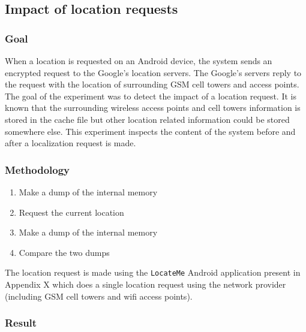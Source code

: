 \subsection{Impact of location requests}

\subsubsection{Goal}

When a location is requested on an Android device, the system sends an encrypted request to the Google's location servers.
The Google's servers reply to the request with the location of surrounding GSM cell towers and access points.\\

The goal of the experiment was to detect the impact of a location request.
It is known that the surrounding wireless access points and cell towers information is stored in the cache file but other location related information could be stored somewhere else.
This experiment inspects the content of the system before and after a localization request is made.


\subsubsection{Methodology}

\begin{enumerate}
\item Make a dump of the internal memory
\item Request the current location
\item Make a dump of the internal memory
\item Compare the two dumps
\end{enumerate}

The location request is made using the \texttt{LocateMe} Android application present in Appendix X which does a single location request using the network provider (including GSM cell towers and wifi access points).

\subsubsection{Result}

